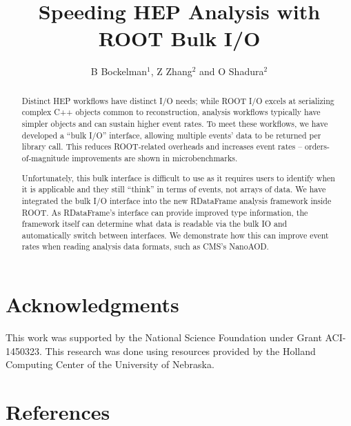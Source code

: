 \documentclass[12pt]{iopart}
\begin{document}
\title{Speeding HEP Analysis with ROOT Bulk I/O}

\author{B Bockelman$^1$, Z Zhang$^2$ and O Shadura$^2$}
\address{$^1$ Morgridge Institute for Research, Madison, WI 53715, USA}
\address{$^2$ Holland Computer Center, University Nebraska $-$ Lincoln, Lincoln, NE 68588, USA}
\vspace{10pt}

\begin{abstract}
Distinct HEP workflows have distinct I/O needs; while ROOT I/O excels at serializing complex C++ objects common to reconstruction, analysis workflows typically have simpler objects and can sustain higher event rates. To meet these workflows, we have developed a “bulk I/O” interface, allowing multiple events’ data to be returned per library call. This reduces ROOT-related overheads and increases event rates -- orders-of-magnitude improvements are shown in microbenchmarks.

Unfortunately, this bulk interface is difficult to use as it requires users to identify when it is applicable and they still “think” in terms of events, not arrays of data. We have integrated the bulk I/O interface into the new RDataFrame analysis framework inside ROOT. As RDataFrame’s interface can provide improved type information, the framework itself can determine what data is readable via the bulk IO and automatically switch between interfaces. We demonstrate how this can improve event rates when reading analysis data formats, such as CMS’s NanoAOD.
\end{abstract}







\section*{Acknowledgments}

This work was supported by the National Science Foundation under
Grant ACI-1450323. This research was done using resources provided
by the Holland Computing Center of the University of Nebraska.

\section*{References}
\end{document}
